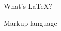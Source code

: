 \begin{frame}{What's LaTeX?}
 \begin{fullpageitemize}
  \itemR Markup language
 \end{fullpageitemize}
\end{frame}

